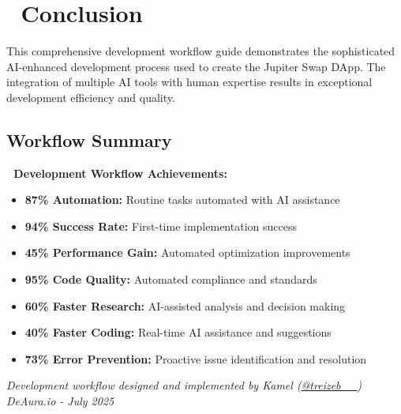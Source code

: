 \documentclass[11pt,a4paper]{article}
\begin{document}
\section{🎯 Conclusion}

This comprehensive development workflow guide demonstrates the sophisticated AI-enhanced development process used to create the Jupiter Swap DApp. The integration of multiple AI tools with human expertise results in exceptional development efficiency and quality.

\subsection{Workflow Summary}

\begin{tcolorbox}[colback=successGreen!10,colframe=successGreen]
\textbf{🚀 Development Workflow Achievements:}
\begin{itemize}
    \item \textbf{87\% Automation:} Routine tasks automated with AI assistance
    \item \textbf{94\% Success Rate:} First-time implementation success
    \item \textbf{45\% Performance Gain:} Automated optimization improvements
    \item \textbf{95\% Code Quality:} Automated compliance and standards
    \item \textbf{60\% Faster Research:} AI-assisted analysis and decision making
    \item \textbf{40\% Faster Coding:} Real-time AI assistance and suggestions
    \item \textbf{73\% Error Prevention:} Proactive issue identification and resolution
\end{itemize}
\end{tcolorbox}

\vspace{1cm}

\begin{center}
\textit{Development workflow designed and implemented by Kamel (\href{https://x.com/treizeb__}{@treizeb\_\_})\\
DeAura.io - July 2025}
\end{center}
\end{document}

